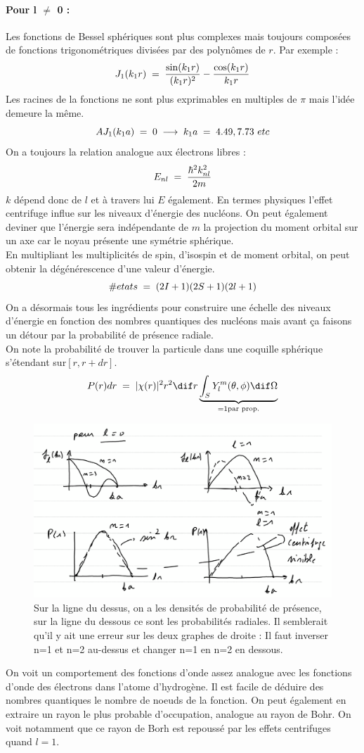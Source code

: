 \paragraph{Pour l $\neq$ 0 :} Les fonctions de Bessel sphériques sont plus complexes mais toujours composées de fonctions trigonométriques divisées par des polynômes de $r$. Par exemple :
\[
    J_1(k_1 r) \; = \; \dfrac{\sin(k_1 r)}{(k_1 r)^2} - \dfrac{\cos(k_1r)}{k_1r}
\]
Les racines de la fonctions ne sont plus exprimables en multiples de $\pi$ mais l'idée demeure la même.
\[
    AJ_1(k_1a) \; = \; 0 \; \longrightarrow \; k_1 a \; = \; 4.49,7.73 \ etc
\]
On a toujours la relation analogue aux électrons libres :
\[
    E_{nl} \; = \; \dfrac{\hbar^2k_{nl}^2}{2m}
\]
$k$ dépend donc de $l$ et à travers lui $E$ également. En termes physiques l'effet centrifuge influe sur les niveaux d'énergie des nucléons. On peut également deviner que l'énergie sera indépendante de $m$ la projection du moment orbital sur un axe car le noyau présente une symétrie sphérique.\\
En multipliant les multiplicités de spin, d'isospin et de moment orbital, on peut obtenir la dégénérescence d'une valeur d'énergie.
\[
    \#etats \; = \; (2I+1)(2S+1)(2l+1)
\]
On a désormais tous les ingrédients pour construire une échelle des niveaux d'énergie en fonction des nombres quantiques des nucléons mais avant ça faisons un détour par la probabilité de présence radiale.\\
On note la probabilité de trouver la particule dans une coquille sphérique s'étendant sur$ [r,r+dr]$.
\[
    P(r)dr \eq |\chi(r)|^2 r^2 \dif r \underbrace{\int_S Y_l^m(\theta,\phi)\dif\Omega}_{= 1 \text{par prop.}}
\]
\begin{figure}[H]
    \centering
    \includegraphics[scale = 0.6]{Images4/proba volumique.PNG}
    \caption{Sur la ligne du dessus, on a les densités de probabilité de présence, sur la ligne du dessous ce sont les probabilités radiales. Il semblerait qu'il y ait une erreur sur les deux graphes de droite : Il faut inverser n=1 et n=2 au-dessus et changer n=1 en n=2 en dessous.}
\end{figure}
On voit un comportement des fonctions d'onde assez analogue avec les fonctions d'onde des électrons dans l'atome d'hydrogène. Il est facile de déduire des nombres quantiques le nombre de noeuds de la fonction. On peut également en extraire un rayon le plus probable d'occupation, analogue au rayon de Bohr. On voit notamment que ce rayon de Borh est repoussé par les effets centrifuges quand $l = 1$.
